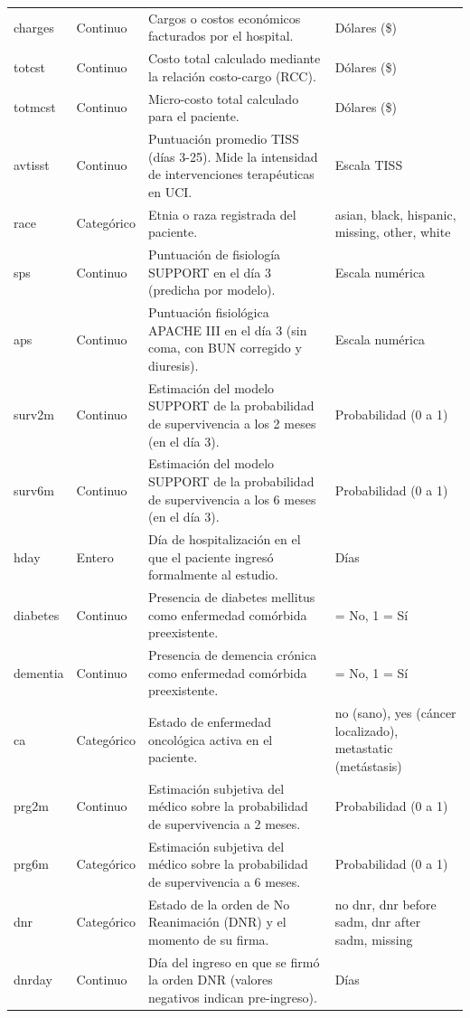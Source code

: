 \begin{longtable}{>{\raggedright\arraybackslash}p{2.1cm}>{\raggedright\arraybackslash}p{1.8cm}>{\raggedright\arraybackslash}p{7.0cm}>{\raggedright\arraybackslash}p{3.2cm}}
charges & Continuo & Cargos o costos económicos facturados por el hospital. & Dólares (\$) \\
totcst & Continuo & Costo total calculado mediante la relación costo-cargo (RCC). & Dólares (\$) \\
totmcst & Continuo & Micro-costo total calculado para el paciente. & Dólares (\$) \\
avtisst & Continuo & Puntuación promedio TISS (días 3-25). Mide la intensidad de intervenciones terapéuticas en UCI. & Escala TISS \\
race & Categórico & Etnia o raza registrada del paciente. & asian, black, hispanic, missing, other, white \\
sps & Continuo & Puntuación de fisiología SUPPORT en el día 3 (predicha por modelo). & Escala numérica \\
aps & Continuo & Puntuación fisiológica APACHE III en el día 3 (sin coma, con BUN corregido y diuresis). & Escala numérica \\
surv2m & Continuo & Estimación del modelo SUPPORT de la probabilidad de supervivencia a los 2 meses (en el día 3). & Probabilidad (0 a 1) \\
surv6m & Continuo & Estimación del modelo SUPPORT de la probabilidad de supervivencia a los 6 meses (en el día 3). & Probabilidad (0 a 1) \\
hday & Entero & Día de hospitalización en el que el paciente ingresó formalmente al estudio. & Días \\
diabetes & Continuo & Presencia de diabetes mellitus como enfermedad comórbida preexistente. & 0 = No, 1 = Sí \\
dementia & Continuo & Presencia de demencia crónica como enfermedad comórbida preexistente. & 0 = No, 1 = Sí \\
ca & Categórico & Estado de enfermedad oncológica activa en el paciente. & no (sano), yes (cáncer localizado), metastatic (metástasis) \\
prg2m & Continuo & Estimación subjetiva del médico sobre la probabilidad de supervivencia a 2 meses. & Probabilidad (0 a 1) \\
prg6m & Categórico & Estimación subjetiva del médico sobre la probabilidad de supervivencia a 6 meses. & Probabilidad (0 a 1) \\
dnr & Categórico & Estado de la orden de No Reanimación (DNR) y el momento de su firma. & no dnr, dnr before sadm, dnr after sadm, missing \\
dnrday & Continuo & Día del ingreso en que se firmó la orden DNR (valores negativos indican pre-ingreso). & Días \\

\end{longtable}
